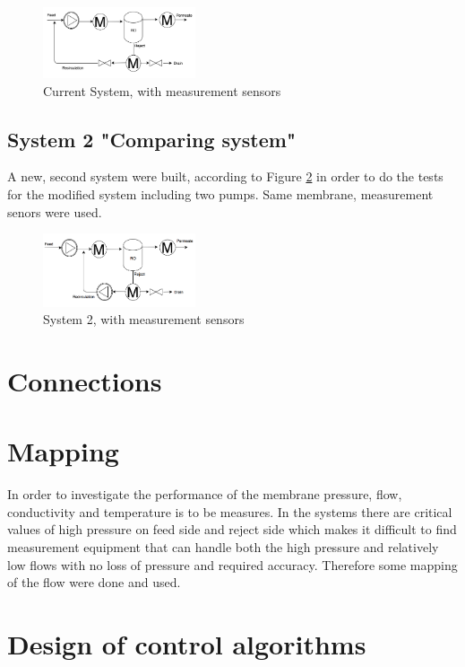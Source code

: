 \begin{figure}[h]
    \centering
    \includegraphics[width=0.4\textwidth]{MeasCurrSys}
    \caption{Current System, with measurement sensors}
    \label{fig:MeasCurrSys}
\end{figure}

\subsection{System 2  "Comparing system"}
A new, second system were built, according to Figure \ref{fig:MeasSys2} in order to do the tests for the modified system including two pumps. Same membrane, measurement senors were used.

\begin{figure}[h]
    \centering
    \includegraphics[width=0.4\textwidth]{MeasSys2}
    \caption{System 2, with measurement sensors}
    \label{fig:MeasSys2}
\end{figure}

\section{Connections} \label{Connections}


\section{Mapping}
In order to investigate the performance of the membrane pressure, flow, conductivity and temperature is to be measures. In the systems there are critical values of high pressure on feed side and reject side which makes it difficult to find measurement equipment that can handle both the high pressure and relatively low flows with no loss of pressure and required accuracy. Therefore some mapping of the flow were done and used. 


\section{Design of control algorithms}

